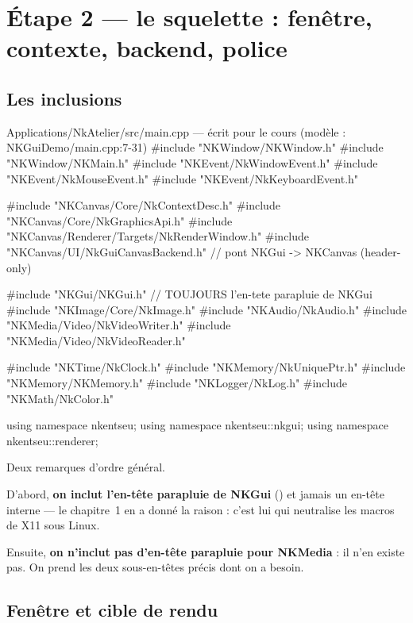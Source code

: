 \section{Étape 2 — le squelette : fenêtre, contexte, backend, police}

\subsection{Les inclusions}

\begin{nkcode}{Applications/NkAtelier/src/main.cpp — écrit pour le cours (modèle : NKGuiDemo/main.cpp:7-31)}
#include "NKWindow/NKWindow.h"
#include "NKWindow/NKMain.h"
#include "NKEvent/NkWindowEvent.h"
#include "NKEvent/NkMouseEvent.h"
#include "NKEvent/NkKeyboardEvent.h"

#include "NKCanvas/Core/NkContextDesc.h"
#include "NKCanvas/Core/NkGraphicsApi.h"
#include "NKCanvas/Renderer/Targets/NkRenderWindow.h"
#include "NKCanvas/UI/NkGuiCanvasBackend.h"   // pont NKGui -> NKCanvas (header-only)

#include "NKGui/NKGui.h"                      // TOUJOURS l'en-tete parapluie de NKGui
#include "NKImage/Core/NkImage.h"
#include "NKAudio/NkAudio.h"
#include "NKMedia/Video/NkVideoWriter.h"
#include "NKMedia/Video/NkVideoReader.h"

#include "NKTime/NkClock.h"
#include "NKMemory/NkUniquePtr.h"
#include "NKMemory/NKMemory.h"
#include "NKLogger/NkLog.h"
#include "NKMath/NkColor.h"

using namespace nkentseu;
using namespace nkentseu::nkgui;
using namespace nkentseu::renderer;
\end{nkcode}

Deux remarques d'ordre général.

D'abord, \textbf{on inclut l'en-tête parapluie de NKGui}
() et jamais un en-tête interne — le chapitre~1 en a donné
la raison : c'est lui qui neutralise les macros de X11 sous Linux.

Ensuite, \textbf{on n'inclut pas d'en-tête parapluie pour NKMedia} : il n'en
existe pas. On prend les deux sous-en-têtes précis dont on a besoin.

\subsection{Fenêtre et cible de rendu}

